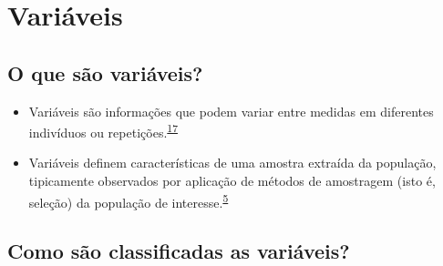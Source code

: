 \documentclass[
]{book}
\begin{document}
\hypertarget{variaveis}{%
\section{Variáveis}\label{variaveis}}

\hypertarget{o-que-suxe3o-variuxe1veis}{%
\subsection{O que são variáveis?}\label{o-que-suxe3o-variuxe1veis}}

\begin{itemize}
\item
  Variáveis são informações que podem variar entre medidas em diferentes indivíduos ou repetições.\textsuperscript{\protect\hyperlink{ref-Altman1999}{17}}
\item
  Variáveis definem características de uma amostra extraída da população, tipicamente observados por aplicação de métodos de amostragem (isto é, seleção) da população de interesse.\textsuperscript{\protect\hyperlink{ref-vetter2017}{5}}
\end{itemize}

\hypertarget{como-suxe3o-classificadas-as-variuxe1veis}{%
\subsection{Como são classificadas as variáveis?}\label{como-suxe3o-classificadas-as-variuxe1veis}}
\end{document}
